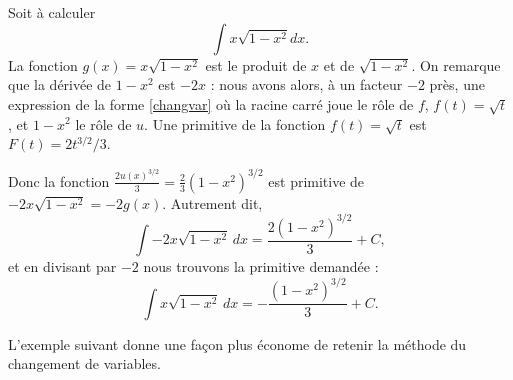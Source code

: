 \begin{example}
    Soit à calculer
    \begin{equation}
        \int x\sqrt{1-x^2}dx.
    \end{equation}
La fonction $g(x) = x\sqrt{1-x^2}$ est le produit de $x$ et de $\sqrt{1-x^2}$. On remarque que la dérivée de $1-x^2$ est $-2x$ : nous avons alors, à un facteur $-2$ près, une expression de la forme \eqref{changvar} où la racine carré joue le r\^ole de $f$, \( f(t)=\sqrt{t}\),   et $1-x^2$ le r\^ole de $u$.  Une primitive de la fonction \( f(t)=\sqrt{t}\) est $F(t) = 2t^{3/2}/3$. 
    
    Donc la fonction
      $  \frac{ 2u(x)^{3/2} }{ 3 }=\frac{ 2 }{ 3 }(1-x^2)^{3/2}$
    est primitive de
     $   -2x\sqrt{1-x^2} = -2 g(x)$.
    Autrement dit,
    \begin{equation}
        \int -2x\sqrt{1-x^2}\,dx=\frac{ 2 (1-x^2)^{3/2}}{ 3 } + C,
    \end{equation}
    et en divisant par \( -2\) nous trouvons la primitive demandée :
    \begin{equation}
        \int x\sqrt{1-x^2}\,dx=-\frac{ (1-x^2)^{3/2} }{ 3 } + C.
    \end{equation}
\end{example}

L'exemple suivant donne une façon plus économe de retenir la méthode du changement de variables.

